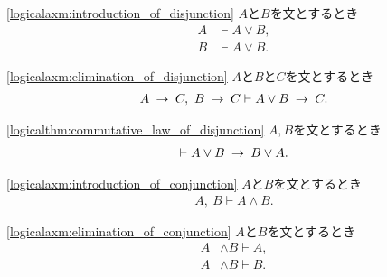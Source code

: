 	\begin{screen}
		\begin{logicalaxm}[論理和の導入]
		\ref{logicalaxm:introduction_of_disjunction}
			$A$と$B$を文とするとき
			\begin{align}
				A &\vdash A \vee B, \\
				B &\vdash A \vee B.
			\end{align}
		\end{logicalaxm}
	\end{screen}
	
	\begin{screen}
		\begin{logicalaxm}[場合分け規則]
		\ref{logicalaxm:elimination_of_disjunction}
			$A$と$B$と$C$を文とするとき
			\begin{align}
				A \hspace{0.25em}\rightarrow\hspace{0.25em} C,\ B \hspace{0.25em}\rightarrow\hspace{0.25em} C \vdash A \vee B \hspace{0.25em}\rightarrow\hspace{0.25em} C.
			\end{align}
		\end{logicalaxm}
	\end{screen}
	
	\begin{screen}
		\begin{logicalthm}[論理和の可換律]
		\ref{logicalthm:commutative_law_of_disjunction}
			$A,B$を文とするとき
			\begin{align}
				\vdash A \vee B \hspace{0.25em}\rightarrow\hspace{0.25em} B \vee A.
			\end{align}
		\end{logicalthm}
	\end{screen}
	
	\begin{screen}
		\begin{logicalaxm}[論理積の導入]
		\ref{logicalaxm:introduction_of_conjunction}
			$A$と$B$を文とするとき
			\begin{align}
				A,\ B \vdash A \wedge B.
			\end{align}
		\end{logicalaxm}
	\end{screen}
	
	\begin{screen}
		\begin{logicalaxm}[論理積の除去]
		\ref{logicalaxm:elimination_of_conjunction}
			$A$と$B$を文とするとき
			\begin{align}
				A &\wedge B \vdash A, \\
				A &\wedge B \vdash B.
			\end{align}
		\end{logicalaxm}
	\end{screen}
	
